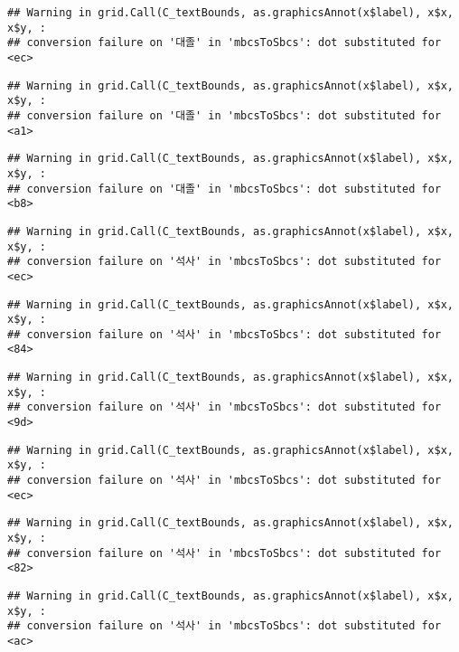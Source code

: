 \documentclass[
]{article}
\begin{document}
\begin{verbatim}
## Warning in grid.Call(C_textBounds, as.graphicsAnnot(x$label), x$x, x$y, :
## conversion failure on '대졸' in 'mbcsToSbcs': dot substituted for <ec>
\end{verbatim}

\begin{verbatim}
## Warning in grid.Call(C_textBounds, as.graphicsAnnot(x$label), x$x, x$y, :
## conversion failure on '대졸' in 'mbcsToSbcs': dot substituted for <a1>
\end{verbatim}

\begin{verbatim}
## Warning in grid.Call(C_textBounds, as.graphicsAnnot(x$label), x$x, x$y, :
## conversion failure on '대졸' in 'mbcsToSbcs': dot substituted for <b8>
\end{verbatim}

\begin{verbatim}
## Warning in grid.Call(C_textBounds, as.graphicsAnnot(x$label), x$x, x$y, :
## conversion failure on '석사' in 'mbcsToSbcs': dot substituted for <ec>
\end{verbatim}

\begin{verbatim}
## Warning in grid.Call(C_textBounds, as.graphicsAnnot(x$label), x$x, x$y, :
## conversion failure on '석사' in 'mbcsToSbcs': dot substituted for <84>
\end{verbatim}

\begin{verbatim}
## Warning in grid.Call(C_textBounds, as.graphicsAnnot(x$label), x$x, x$y, :
## conversion failure on '석사' in 'mbcsToSbcs': dot substituted for <9d>
\end{verbatim}

\begin{verbatim}
## Warning in grid.Call(C_textBounds, as.graphicsAnnot(x$label), x$x, x$y, :
## conversion failure on '석사' in 'mbcsToSbcs': dot substituted for <ec>
\end{verbatim}

\begin{verbatim}
## Warning in grid.Call(C_textBounds, as.graphicsAnnot(x$label), x$x, x$y, :
## conversion failure on '석사' in 'mbcsToSbcs': dot substituted for <82>
\end{verbatim}

\begin{verbatim}
## Warning in grid.Call(C_textBounds, as.graphicsAnnot(x$label), x$x, x$y, :
## conversion failure on '석사' in 'mbcsToSbcs': dot substituted for <ac>
\end{verbatim}
\end{document}

